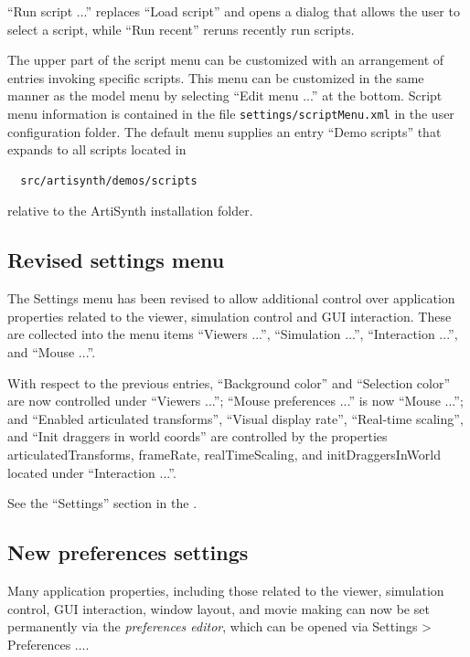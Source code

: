 \documentclass{article}
\begin{document}
{\sf ``Run script ...''} replaces {\sf ``Load script''} and opens a
dialog that allows the user to select a script, while {\sf ``Run
recent''} reruns recently run scripts.

The upper part of the script menu can be customized with an
arrangement of entries invoking specific scripts. This menu can be
customized in the same manner as the model menu by selecting {\sf
``Edit menu ...''} at the bottom. Script menu
information is contained in the file {\tt settings/scriptMenu.xml} in
the user configuration folder. The default menu supplies an entry
{\sf ``Demo scripts''} that expands to all scripts located in
%
\begin{verbatim}
  src/artisynth/demos/scripts
\end{verbatim}
%
relative to the ArtiSynth installation folder.

\subsection*{Revised settings menu}

The {\sf Settings} menu has been revised to allow additional control
over application properties related to the viewer, simulation control
and GUI interaction. These are collected into the menu items {\sf
``Viewers ...''}, {\sf ``Simulation ...''}, {\sf ``Interaction ...''},
and {\sf ``Mouse ...''}.

With respect to the previous entries, {\sf ``Background color''} and
{\sf ``Selection color''} are now controlled under {\sf ``Viewers
...''}; {\sf ``Mouse preferences ...''} is now {\sf ``Mouse ...''};
and {\sf ``Enabled articulated transforms''}, {\sf ``Visual display
rate''}, {\sf ``Real-time scaling''}, and {\sf ``Init draggers in
world coords''} are controlled by the properties {\sf
articulatedTransforms}, {\sf frameRate}, {\sf realTimeScaling}, and
{\sf initDraggersInWorld} located under {\sf ``Interaction ...''}.

See the ``Settings'' section in the .

\subsection*{New preferences settings}

Many application properties, including those related to the viewer,
simulation control, GUI interaction, window layout, and movie making
can now be set permanently via the {\it preferences editor}, which can
be opened via {\sf Settings > Preferences ...}.
\end{document}
